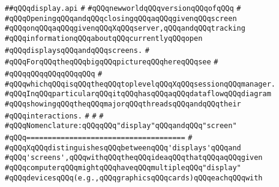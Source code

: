 \label{src/lib/x-kit/xclient/src/wire/display.api}
\verb|##qQQqdisplay.api|\newline
\verb|#|\newline
\verb|#qQQqnewworldqQQqversionqQQqofqQQq|\newline
\verb|#|\newline
\verb|#qQQqOpeningqQQqandqQQqclosingqQQqaqQQqgivenqQQqscreen|\newline
\verb|#qQQqonqQQqaqQQqgivenqQQqXqQQqserver,qQQqandqQQqtracking|\newline
\verb|#qQQqinformationqQQqaboutqQQqcurrentlyqQQqopen|\newline
\verb|#qQQqdisplaysqQQqandqQQqscreens.|\newline
\verb|#|\newline
\verb|#qQQqForqQQqtheqQQqbigqQQqpictureqQQqhereqQQqsee|\newline
\verb|#|\newline
\verb|#qQQqqQQqqQQqqQQqqQQq|\newline
\verb|#|\newline
\verb|#qQQqwhichqQQqisqQQqtheqQQqtoplevelqQQqXqQQqsessionqQQqmanager.|\newline
\verb|#qQQqInqQQqparticularqQQqitqQQqhasqQQqaqQQqdataflowqQQqdiagram|\newline
\verb|#qQQqshowingqQQqtheqQQqmajorqQQqthreadsqQQqandqQQqtheir|\newline
\verb|#qQQqinteractions.|\newline
\verb|#|\newline
\verb|#|\newline
\verb|#|\newline
\verb|#qQQqNomenclature:qQQqqQQq"display"qQQqandqQQq"screen"|\newline
\verb|#qQQq=====================================|\newline
\verb|#|\newline
\verb|#qQQqXqQQqdistinguishesqQQqbetweenqQQq'displays'qQQqand|\newline
\verb|#qQQq'screens',qQQqwithqQQqtheqQQqideaqQQqthatqQQqaqQQqgiven|\newline
\verb|#qQQqcomputerqQQqmightqQQqhaveqQQqmultipleqQQq"display"|\newline
\verb|#qQQqdevicesqQQq(e.g.,qQQqgraphicsqQQqcards)qQQqeachqQQqwith|\newline
